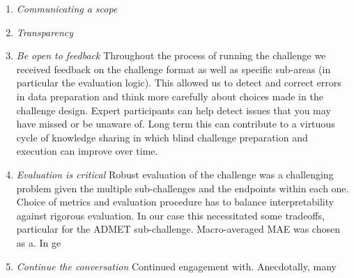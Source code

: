 \documentclass[journal=jcim,manuscript=article]{achemso}
\begin{document}
\begin{enumerate}
    \item \textit{Communicating a scope} 
    \item \textit{Transparency} %
    \item \textit{Be open to feedback}  Throughout the process of running the challenge we received feedback on the challenge format as well as specific sub-areas (in particular the evaluation logic). This allowed us to detect and correct errors in data preparation and think more carefully about choices made in the challenge design. Expert participants can help detect issues that you may have missed or be unaware of. Long term this can contribute to a virtuous cycle of knowledge sharing in which blind challenge preparation and execution can improve over time. 
    \item \textit{Evaluation is critical} Robust evaluation of the challenge was a challenging problem given the multiple sub-challenges and the endpoints within each one. Choice of metrics and evaluation procedure has to balance interpretability against rigorous evaluation. In our case this necessitated some tradeoffs, particular for the ADMET sub-challenge. Macro-averaged MAE was chosen as a. In ge
    
    \item \textit{Continue the conversation} Continued engagement with. Anecdotally, many 
\end{enumerate}







\end{document}
